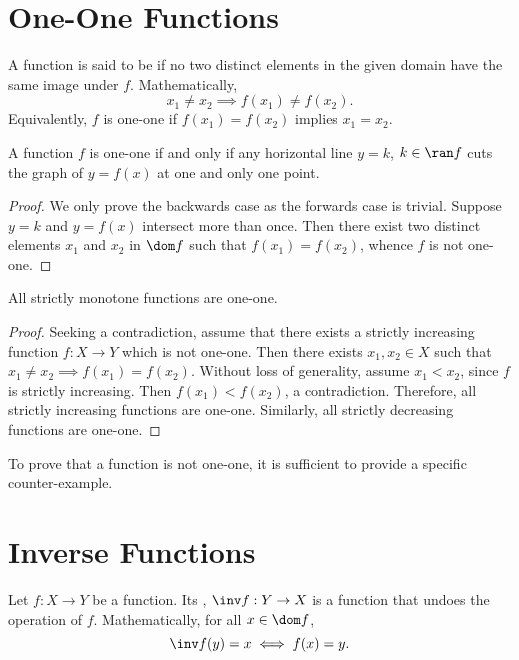 \section{One-One Functions}

\begin{definition}
    A function is said to be  if no two distinct elements in the given domain have the same image under $f$. Mathematically, \[x_1 \neq x_2 \implies f(x_1) \neq f(x_2).\] Equivalently, $f$ is one-one if $f(x_1) = f(x_2)$ implies $x_1 = x_2$.
\end{definition}

\begin{proposition}
    A function $f$ is one-one if and only if any horizontal line $y = k$, $k \in \ran f$ cuts the graph of $y = f(x)$ at one and only one point.
\end{proposition}
\begin{proof}
    We only prove the backwards case as the forwards case is trivial. Suppose $y = k$ and $y = f(x)$ intersect more than once. Then there exist two distinct elements $x_1$ and $x_2$ in $\dom f$ such that $f(x_1) = f(x_2)$, whence $f$ is not one-one.
\end{proof}

\begin{proposition}
    All strictly monotone functions are one-one.
\end{proposition}
\begin{proof}
    Seeking a contradiction, assume that there exists a strictly increasing function $f : X \to Y$ which is not one-one. Then there exists $x_1, x_2 \in X$ such that $x_1 \neq x_2 \implies f(x_1) = f(x_2)$. Without loss of generality, assume $x_1 < x_2$, since $f$ is strictly increasing. Then $f(x_1) < f(x_2)$, a contradiction. Therefore, all strictly increasing functions are one-one. Similarly, all strictly decreasing functions are one-one.
\end{proof}

To prove that a function is not one-one, it is sufficient to provide a specific counter-example.

\section{Inverse Functions}

\begin{definition}
    Let $f : X \to Y$ be a function. Its , $\inv f : Y \to X$ is a function that undoes the operation of $f$. Mathematically, for all $x \in \dom f$, \[\inv f(y) = x \iff f(x) = y.\]
\end{definition}

